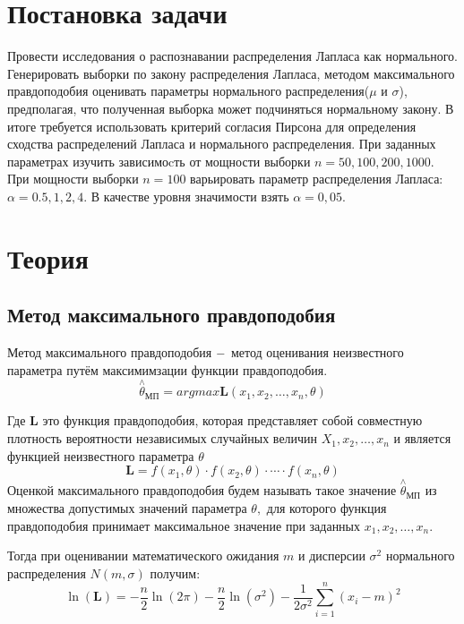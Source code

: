 \documentclass[a4]{article}
\begin{document}
\section{Постановка задачи}
Провести исследования о распознавании распределения Лапласа как нормального. Генерировать выборки по закону распределения Лапласа, методом максимального правдоподобия оценивать параметры нормального распределения($\mu$ и $\sigma$), предполагая, что полученная выборка может подчиняться нормальному закону. В итоге требуется использовать критерий согласия Пирсона для определения сходства распределений Лапласа и нормального распределения. При заданных параметрах изучить зависимоcть от мощности выборки $n = 50, 100, 200, 1000$. При мощности выборки $n = 100$ варьировать параметр распределения Лапласа: $\alpha = 0.5, 1, 2, 4$. В качестве уровня значимости взять $\alpha=0,05.$

\section{Теория}
\subsection{Метод максимального правдоподобия}
Метод максимального правдоподобия $\--$ метод оценивания неизвестного параметра путём максимимзации функции правдоподобия.
\begin{equation}
    \overset{\wedge}{\theta}_{\text{МП}}=argmax \mathbf{L}(x_1,x_2,\ldots,x_n,\theta)
\end{equation}

Где $\mathbf{L}$ это функция правдоподобия, которая представляет собой совместную плотность вероятности независимых случайных величин $X_1,x_2,\ldots,x_n$ и является функцией неизвестного параметра $\theta$
\begin{equation}
    \mathbf{L} = f(x_1,\theta)\cdot f(x_2,\theta)\cdot\cdots\cdot f(x_n,\theta)
\end{equation}
Оценкой максимального правдоподобия будем называть такое значение $\overset{\wedge}{\theta}_{\text{МП}}$ из множества допустимых значений параметра $\theta,$ для которого функция правдоподобия принимает максимальное значение при заданных $x_1,x_2,\ldots,x_n.$

Тогда при оценивании математического ожидания $m$ и дисперсии $\sigma^2$ нормального распределения $N(m,\sigma)$ получим:
\begin{equation}
    \ln(\mathbf{L})=-\frac{n}{2}\ln(2\pi)-\frac{n}{2}\ln\left(\sigma^2\right)-\frac{1}{2\sigma^2}\sum\limits_{i=1}^n(x_i-m)^2
\end{equation}
\end{document}

